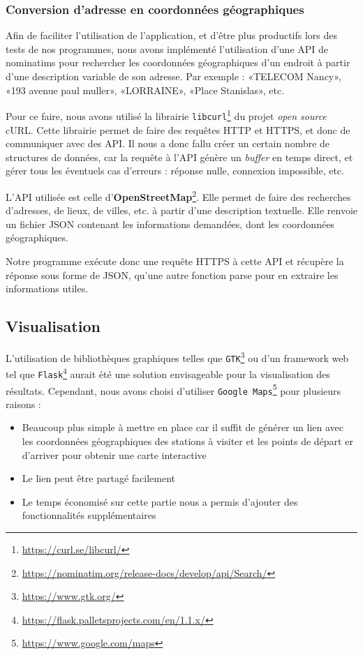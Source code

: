 \documentclass[a4paper, 12pt]{report}
\begin{document}
\subsubsection{Conversion d'adresse en coordonnées géographiques}
Afin de faciliter l'utilisation de l'application, et d'être plus productifs lors des tests de nos programmes, nous avons implémenté l'utilisation d'une API de nominatims pour rechercher les coordonnées géographiques d'un endroit à partir d'une description variable de son adresse. Par exemple : «TELECOM Nancy», «193 avenue paul muller», «LORRAINE», «Place Stanislas», etc.\par\bigskip
Pour ce faire, nous avons utilisé la librairie \texttt{libcurl}\footnote{\url{https://curl.se/libcurl/}} du projet \textit{open source} cURL. Cette librairie permet de faire des requêtes HTTP et HTTPS, et donc de communiquer avec des API. Il nous a donc fallu créer un certain nombre de structures de données, car la requête à l'API génère un \textit{buffer} en temps direct, et gérer tous les éventuels cas d'erreurs : réponse nulle, connexion impossible, etc.\par\bigskip
L'API utilisée est celle d'\textbf{OpenStreetMap}\footnote{\url{https://nominatim.org/release-docs/develop/api/Search/}}. Elle permet de faire des recherches d'adresses, de lieux, de villes, etc. à partir d'une description textuelle. Elle renvoie un fichier JSON contenant les informations demandées, dont les coordonnées géographiques.\par\bigskip
Notre programme exécute donc une requête HTTPS à cette API et récupère la réponse sous forme de JSON, qu'une autre fonction parse pour en extraire les informations utiles.\par\bigskip
\subsection{Visualisation}
L'utilisation de bibliothèques graphiques telles que \texttt{GTK}\footnote{\url{https://www.gtk.org/}} ou d'un framework web tel que \texttt{Flask}\footnote{\url{https://flask.palletsprojects.com/en/1.1.x/}} aurait été une solution envisageable pour la visualisation des résultats. Cependant, nous avons choisi d'utiliser \texttt{Google Maps}\footnote{\url{https://www.google.com/maps}} pour plusieurs raisons :
\begin{itemize}
    \item Beaucoup plus simple à mettre en place car il suffit de générer un lien avec les coordonnées géographiques des stations à visiter et les points de départ er d'arriver pour obtenir une carte interactive
    \item Le lien peut être partagé facilement
    \item Le temps économisé sur cette partie nous a permis d'ajouter des fonctionnalités supplémentaires
\end{itemize}
\clearpage
\end{document}
